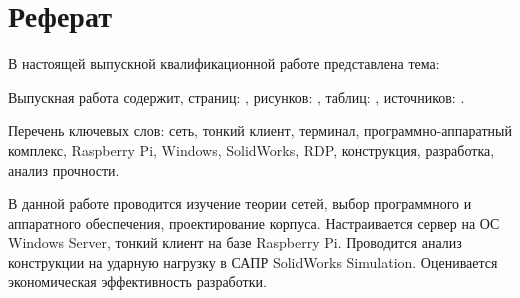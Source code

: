 \chapter*{Реферат}

В настоящей выпускной квалификационной работе представлена тема:

Выпускная работа содержит, страниц: \pageref{LastPage}, рисунков: \totalfigures,
таблиц: \totaltables, источников: .

Перечень ключевых слов: сеть, тонкий клиент, терминал, программно-аппаратный комплекс,
Raspberry Pi, Windows, SolidWorks, RDP, конструкция, разработка, анализ прочности.

В данной работе проводится изучение теории сетей, выбор программного и аппаратного
обеспечения, проектирование корпуса. Настраивается сервер на ОС Windows Server, тонкий
клиент на базе Raspberry Pi. Проводится анализ конструкции на ударную нагрузку в САПР
SolidWorks Simulation. Оценивается экономическая эффективность разработки.

